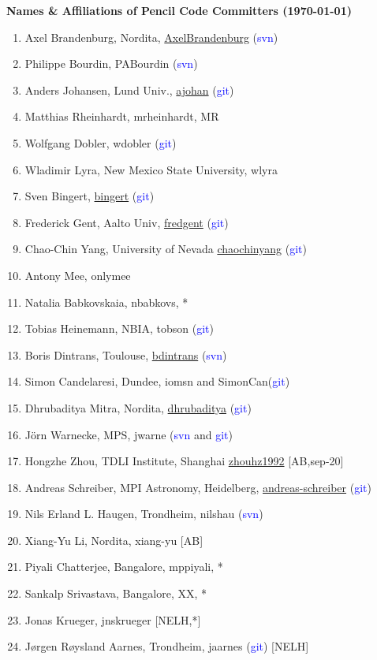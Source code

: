 \documentclass{article}
\def\blue{\textcolor{blue}}
\begin{document}
\noindent
{\Large\bf Names \& Affiliations of {\sc Pencil Code} Committers (\today)}


\begin{enumerate}\itemsep-0.2mm
\item Axel Brandenburg, Nordita, \url{AxelBrandenburg} (\blue{svn})
\item Philippe Bourdin, PABourdin (\blue{svn})
\item Anders Johansen, Lund Univ., \url{ajohan} (\blue{git})
\item Matthias Rheinhardt, mrheinhardt, MR
\item Wolfgang Dobler, wdobler (\blue{git})
\item Wladimir Lyra, New Mexico State University, wlyra
\item Sven Bingert, \url{bingert} (\blue{git})
\item Frederick Gent, Aalto Univ, \url{fredgent} (\blue{git})
\item Chao-Chin Yang, University of Nevada \url{chaochinyang} (\blue{git})
\item Antony Mee, onlymee %
\item Natalia Babkovskaia, nbabkovs, *
\item Tobias Heinemann, NBIA, tobson (\blue{git})
\item Boris Dintrans, Toulouse, \url{bdintrans} (\blue{svn})
\item Simon Candelaresi, Dundee, iomsn and SimonCan(\blue{git}) 
\item Dhrubaditya Mitra, Nordita, \url{dhrubaditya} (\blue{git})
\item J\"orn Warnecke, MPS, jwarne (\blue{svn} and \blue{git})
\item Hongzhe Zhou, TDLI Institute, Shanghai \url{zhouhz1992} [AB,sep-20]
\item Andreas Schreiber, MPI Astronomy, Heidelberg, \url{andreas-schreiber} (\blue{git})
\item Nils Erland L. Haugen, Trondheim, nilshau (\blue{svn})
\item Xiang-Yu Li, Nordita, xiang-yu [AB]
\item Piyali Chatterjee, Bangalore, mppiyali, *
\item Sankalp Srivastava, Bangalore, XX, *
\item Jonas Krueger, jnskrueger [NELH,*]
\item J{\o}rgen R{\o}ysland Aarnes, Trondheim, jaarnes (\blue{git}) [NELH]

\end{enumerate}
\end{document}
